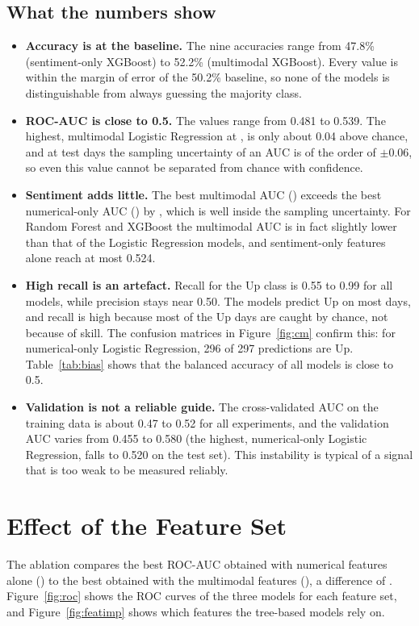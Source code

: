 \subsection{What the numbers show}
\begin{itemize}
  \item \textbf{Accuracy is at the baseline.} The nine accuracies range from 47.8\% (sentiment-only XGBoost) to 52.2\% (multimodal XGBoost). Every value is within the margin of error of the 50.2\% baseline, so none of the models is distinguishable from always guessing the majority class.
  \item \textbf{ROC-AUC is close to 0.5.} The values range from 0.481 to 0.539. The highest, multimodal Logistic Regression at \BestAUC{}, is only about 0.04 above chance, and at \TestDays{} test days the sampling uncertainty of an AUC is of the order of $\pm0.06$, so even this value cannot be separated from chance with confidence.
  \item \textbf{Sentiment adds little.} The best multimodal AUC (\MMBestAUC{}) exceeds the best numerical-only AUC (\NumBestAUC{}) by \AUCDelta{}, which is well inside the sampling uncertainty. For Random Forest and XGBoost the multimodal AUC is in fact slightly lower than that of the Logistic Regression models, and sentiment-only features alone reach at most 0.524.
  \item \textbf{High recall is an artefact.} Recall for the Up class is 0.55 to 0.99 for all models, while precision stays near 0.50. The models predict Up on most days, and recall is high because most of the Up days are caught by chance, not because of skill. The confusion matrices in Figure~\ref{fig:cm} confirm this: for numerical-only Logistic Regression, 296 of 297 predictions are Up. Table~\ref{tab:bias} shows that the balanced accuracy of all models is close to 0.5.
  \item \textbf{Validation is not a reliable guide.} The cross-validated AUC on the training data is about 0.47 to 0.52 for all experiments, and the validation AUC varies from 0.455 to 0.580 (the highest, numerical-only Logistic Regression, falls to 0.520 on the test set). This instability is typical of a signal that is too weak to be measured reliably.
\end{itemize}

\section{Effect of the Feature Set}
The ablation compares the best ROC-AUC obtained with numerical features alone (\NumBestAUC) to the best obtained with the multimodal features (\MMBestAUC), a difference of \AUCDelta{}. Figure~\ref{fig:roc} shows the ROC curves of the three models for each feature set, and Figure~\ref{fig:featimp} shows which features the tree-based models rely on.

